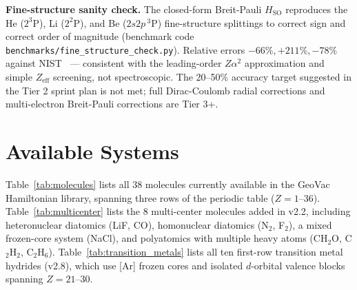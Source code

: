 \documentclass[twocolumn,pra,amsmath,amssymb,superscriptaddress]{revtex4-2}
\begin{document}
\textbf{Fine-structure sanity check.} The closed-form Breit-Pauli
$H_{\mathrm{SO}}$ reproduces the He ($2^3$P), Li ($2^2$P), and Be
($2s2p\,^3$P) fine-structure splittings to correct sign and correct
order of magnitude (benchmark code
\texttt{benchmarks/fine\_structure\_check.py}). Relative errors
$-66\%, +211\%, -78\%$ against NIST~\cite{NIST_ASD} --- consistent
with the leading-order $Z\alpha^2$ approximation and simple
$Z_{\mathrm{eff}}$ screening, not spectroscopic. The 20--50\%
accuracy target suggested in the Tier 2 sprint plan is not met; full
Dirac-Coulomb radial corrections and multi-electron Breit-Pauli
corrections are Tier 3+.

\section{Available Systems}
\label{sec:systems}

Table~\ref{tab:molecules} lists all 38 molecules currently available
in the GeoVac Hamiltonian library, spanning three rows of the periodic
table ($Z = 1$--36).
Table~\ref{tab:multicenter} lists the 8 multi-center molecules added
in v2.2, including heteronuclear diatomics (LiF, CO), homonuclear
diatomics (N$_2$, F$_2$), a mixed frozen-core system (NaCl), and
polyatomics with multiple heavy atoms (CH$_2$O, C$_2$H$_2$, C$_2$H$_6$).
Table~\ref{tab:transition_metals} lists all ten first-row transition metal
hydrides (v2.8), which use [Ar] frozen cores and isolated
$d$-orbital valence blocks spanning $Z = 21$--30.
\end{document}

